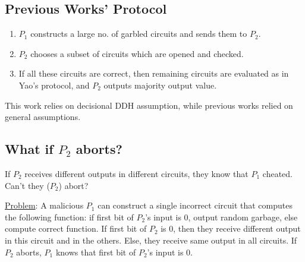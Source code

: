 \subsection{Previous Works' Protocol}
\begin{enumerate}
    \item $P_1$ constructs a large no. of garbled circuits and sends them to $P_2$.
    \item $P_2$ chooses a subset of circuits which are opened and checked.
    \item If all these circuits are correct, then remaining circuits are evaluated as in Yao's protocol, and $P_2$ outputs majority output value.
\end{enumerate}

This work relies on decisional DDH assumption, while previous works relied on general assumptions.

\subsection{What if $P_2$ aborts?}
If $P_2$ receives different outputs in different circuits, they know that $P_1$ cheated. Can't they ($P_2$) abort?

\underline{Problem}: A malicious $P_1$ can construct a single incorrect circuit that computes the following function: if first bit of $P_2$'s input is 0, output random garbage, else compute correct function. If first bit of $P_2$ is 0, then they receive different output in this circuit and in the others. Else, they receive same output in all circuits. If $P_2$ aborts, $P_1$ knows that first bit of $P_2$'s input is 0.

